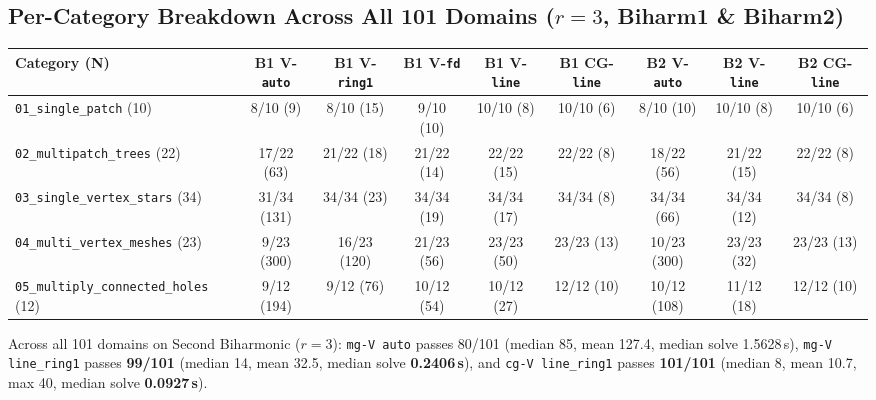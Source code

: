 \documentclass[10pt,a4paper]{article}
\begin{document}
\subsection{Per-Category Breakdown Across All 101 Domains ($r=3$, Biharm1 \& Biharm2)}
\begin{center}
\scriptsize
\setlength{\tabcolsep}{4pt}
\begin{tabular}{@{}lcccccccc@{}}
\toprule
\textbf{Category (N)} & \textbf{B1 V-\texttt{auto}} & \textbf{B1 V-\texttt{ring1}} & \textbf{B1 V-\texttt{fd}} & \textbf{B1 V-\texttt{line}} & \textbf{B1 CG-\texttt{line}} & \textbf{B2 V-\texttt{auto}} & \textbf{B2 V-\texttt{line}} & \textbf{B2 CG-\texttt{line}} \\
\midrule
\texttt{01\_single\_patch} (10) & 8/10 (9) & 8/10 (15) & 9/10 (10) & 10/10 (8) & 10/10 (6) & 8/10 (10) & 10/10 (8) & 10/10 (6) \\
\texttt{02\_multipatch\_trees} (22) & 17/22 (63) & 21/22 (18) & 21/22 (14) & 22/22 (15) & 22/22 (8) & 18/22 (56) & 21/22 (15) & 22/22 (8) \\
\texttt{03\_single\_vertex\_stars} (34) & 31/34 (131) & 34/34 (23) & 34/34 (19) & 34/34 (17) & 34/34 (8) & 34/34 (66) & 34/34 (12) & 34/34 (8) \\
\texttt{04\_multi\_vertex\_meshes} (23) & 9/23 (300) & 16/23 (120) & 21/23 (56) & 23/23 (50) & 23/23 (13) & 10/23 (300) & 23/23 (32) & 23/23 (13) \\
\texttt{05\_multiply\_connected\_holes} (12) & 9/12 (194) & 9/12 (76) & 10/12 (54) & 10/12 (27) & 12/12 (10) & 10/12 (108) & 11/12 (18) & 12/12 (10) \\
\bottomrule
\end{tabular}
\end{center}
Across all 101 domains on Second Biharmonic ($r=3$): \texttt{mg-V auto} passes 80/101 (median 85, mean 127.4, median solve 1.5628\,s), \texttt{mg-V line\_ring1} passes \textbf{99/101} (median 14, mean 32.5, median solve \textbf{0.2406\,s}), and \texttt{cg-V line\_ring1} passes \textbf{101/101} (median 8, mean 10.7, max 40, median solve \textbf{0.0927\,s}).
\end{document}
